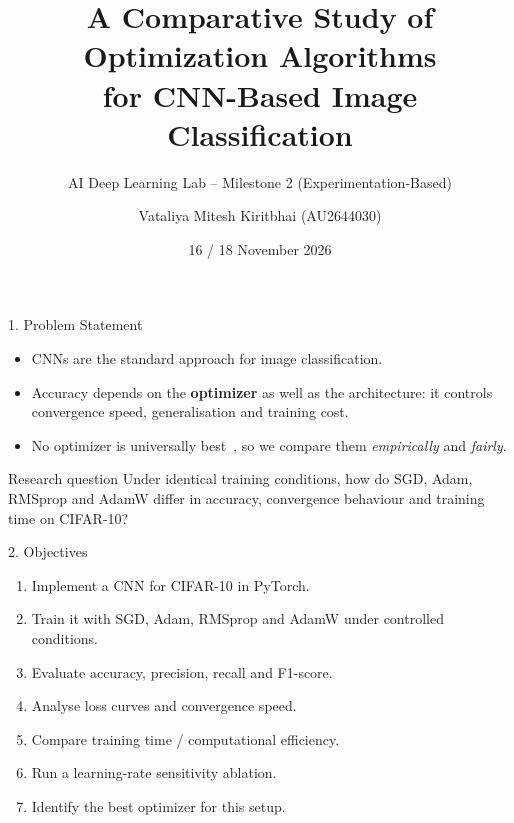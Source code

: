 \documentclass[aspectratio=169,11pt]{beamer}
\title[Optimizers for CNNs]{A Comparative Study of Optimization Algorithms\\for CNN-Based Image Classification}
\subtitle{AI Deep Learning Lab -- Milestone 2 (Experimentation-Based)}
\author[V. Mitesh K.]{Vataliya Mitesh Kiritbhai (AU2644030)}
\institute[M.Tech CSE]{M.Tech CSE \\ \todo{Institution}}
\date[Nov 2026]{16 / 18 November 2026}
\begin{document}
\begin{frame}\titlepage\end{frame}

\begin{frame}{1. Problem Statement}
\begin{itemize}
  \item CNNs are the standard approach for image classification.
  \item Accuracy depends on the \textbf{optimizer} as well as the architecture: it controls convergence speed, generalisation and training cost.
  \item No optimizer is universally best~\footnotemark, so we compare them \emph{empirically} and \emph{fairly}.
\end{itemize}
\vspace{4pt}
\begin{block}{Research question}
Under identical training conditions, how do SGD, Adam, RMSprop and AdamW differ in accuracy, convergence behaviour and training time on CIFAR-10?
\end{block}
\end{frame}

\begin{frame}{2. Objectives}
\begin{enumerate}
  \item Implement a CNN for CIFAR-10 in PyTorch.
  \item Train it with SGD, Adam, RMSprop and AdamW under controlled conditions.
  \item Evaluate accuracy, precision, recall and F1-score.
  \item Analyse loss curves and convergence speed.
  \item Compare training time / computational efficiency.
  \item Run a learning-rate sensitivity ablation.
  \item Identify the best optimizer for this setup.
\end{enumerate}
\end{frame}
\end{document}
